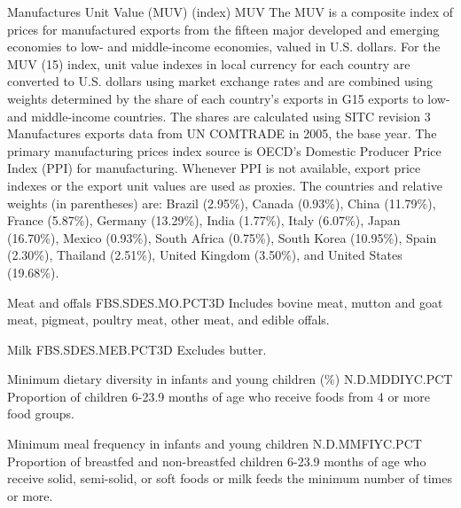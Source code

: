 \begin{MetadataCollection}
\begin{metadata}{ Manufactures Unit Value (MUV) (index) }{ MUV }
The MUV is a composite index of prices for manufactured exports from the fifteen major developed and emerging economies to low- and middle-income economies, valued in U.S. dollars. For the MUV (15) index, unit value indexes in local currency for each country are converted to U.S. dollars using market exchange rates and are combined using weights determined by the share of each country's exports in G15 exports to low- and middle-income countries. The shares are calculated using SITC revision 3 Manufactures exports data from UN COMTRADE in 2005, the base year. The primary manufacturing prices index source is OECD's Domestic Producer Price Index (PPI) for manufacturing. Whenever PPI is not available, export price indexes or the export unit values are used as proxies. The countries and relative weights (in parentheses) are: Brazil (2.95\%), Canada (0.93\%), China (11.79\%), France (5.87\%), Germany (13.29\%), India (1.77\%), Italy (6.07\%), Japan (16.70\%), Mexico (0.93\%), South Africa (0.75\%), South Korea (10.95\%), Spain (2.30\%), Thailand (2.51\%), United Kingdom (3.50\%), and United States (19.68\%). 
\end{metadata}

\begin{metadata}{ Meat and offals }{ FBS.SDES.MO.PCT3D }
Includes bovine meat, mutton and goat meat, pigmeat, poultry meat, other meat, and edible offals. 
\end{metadata}

\begin{metadata}{ Milk }{ FBS.SDES.MEB.PCT3D }
Excludes butter. 
\end{metadata}

\begin{metadata}{ Minimum dietary diversity in infants and young children (\%) }{ N.D.MDDIYC.PCT }
Proportion of children 6-23.9 months of age who receive foods from 4 or more food groups. 
\end{metadata}

\begin{metadata}{ Minimum meal frequency in infants and young children }{ N.D.MMFIYC.PCT }
Proportion of breastfed and non-breastfed children 6-23.9 months of age who receive solid, semi-solid, or soft foods or milk feeds the minimum number of times or more. 
\end{metadata}


\end{MetadataCollection}
